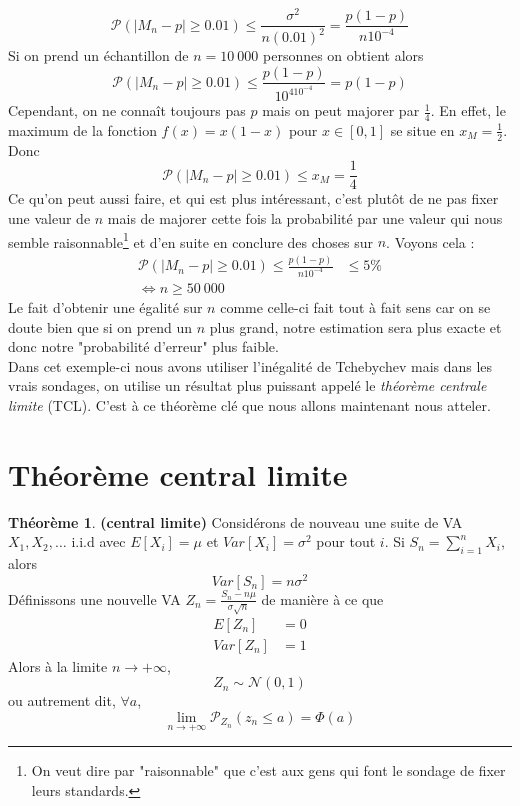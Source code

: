\documentclass[a4paper,12pt]{report}
\theoremstyle{definition}
\newcommand{\ra}{\rightarrow}
\renewcommand{\(}{\left(}
\renewcommand{\)}{\right)}
\renewcommand{\b}{\textbf}
\renewcommand{\P}{\mathcal{P}}
\renewcommand{\d}{\textit}
\newtheorem{thm}{Théorème}[section]
\begin{document}
        $$\P(|M_n-p|\geq0.01)\leq \frac{\sigma^2}{n(0.01)^2}= \frac{p(1-p)}{n10^{-4}}$$
        Si on prend un échantillon de $n=10~000$ personnes on obtient alors
        $$\P(|M_n-p|\geq0.01)\leq \frac{p(1-p)}{10^410^{-4}} = p(1-p)$$
        Cependant, on ne connaît toujours pas $p$ mais on peut majorer par $\frac{1}{4}$. En effet, le maximum de la fonction $f(x)=x(1-x)$ pour $x\in[0,1]$ se situe en $x_M=\frac{1}{2}$. Donc
        $$\P(|M_n-p|\geq0.01)\leq x_M = \frac{1}{4}$$
        Ce qu'on peut aussi faire, et qui est plus intéressant, c'est plutôt de ne pas fixer une valeur de $n$ mais de majorer cette fois la probabilité par une valeur qui nous semble raisonnable\footnote{On veut dire par "raisonnable" que c'est aux gens qui font le sondage de fixer leurs standards.} et d'en suite en conclure des choses sur $n$. Voyons cela :
        \begin{align*}
            \P(|M_n-p|\geq0.01) \leq \frac{p(1-p)}{n10^{-4}} &\leq 5\% \\
            \Leftrightarrow n\geq 50~000
        \end{align*}
        Le fait d'obtenir une égalité sur $n$ comme celle-ci fait tout à fait sens car on se doute bien que si on prend un $n$ plus grand, notre estimation sera plus exacte et donc notre "probabilité d'erreur" plus faible.\\
        
        Dans cet exemple-ci nous avons utiliser l'inégalité de Tchebychev mais dans les vrais sondages, on utilise un résultat plus puissant appelé le \d{théorème centrale limite} (TCL). C'est à ce théorème clé que nous allons maintenant nous atteler.
    
    \section{Théorème central limite}
    
        \begin{leftbar}
        \begin{thm}\b{(central limite)}
        Considérons de nouveau une suite de VA $X_1, X_2, \dots$ i.i.d avec $E[X_i] = \mu$ et $Var[X_i] = \sigma^2$ pour tout $i$. Si $S_n = \sum_{i=1}^n X_i$, alors 
        $$Var[S_n] = n\sigma^2$$
        Définissons une nouvelle VA $Z_n = \frac{S_n-n\mu}{\sigma\sqrt{n}}$ de manière à ce que 
        \begin{align*}
            E[Z_n] &= 0\\
            Var[Z_n] &= 1
        \end{align*}
        Alors à la limite $n\ra+\infty$, 
        $$Z_n\sim \mathcal{N}(0,1)$$
        ou autrement dit, $\forall a$,
        $$\lim\limits_{n\ra+\infty}\P_{Z_n}(z_n\leq a) = \Phi(a)$$
        \end{thm}
        \end{leftbar}
        
\end{document}
